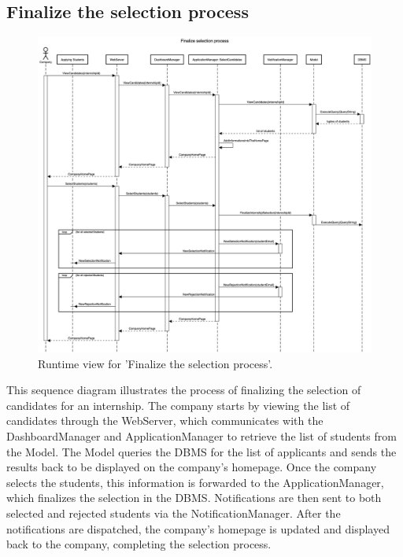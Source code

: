 \subsection{Finalize the selection process}
\begin{figure}[H]
    \begin{center}
        \includegraphics[width=0.8\linewidth]{DD/LaTeX/Images/RuntimeView/FinalizeSelectionProcess.png}
        \caption{Runtime view for 'Finalize the selection process'.}
        \label{fig:runtime_FinalizeSelectionProcess}%
    \end{center}
\end{figure}

This sequence diagram illustrates the process of finalizing the selection of candidates for an internship. The company starts by viewing the list of candidates through the WebServer, which communicates with the DashboardManager and ApplicationManager to retrieve the list of students from the Model. The Model queries the DBMS for the list of applicants and sends the results back to be displayed on the company's homepage. Once the company selects the students, this information is forwarded to the ApplicationManager, which finalizes the selection in the DBMS. Notifications are then sent to both selected and rejected students via the NotificationManager. After the notifications are dispatched, the company's homepage is updated and displayed back to the company, completing the selection process.

